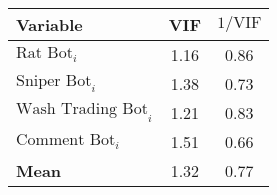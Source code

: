 \begin{tabular}{lcc}
\toprule
Variable & VIF & $1/\text{VIF}$ \\
\midrule
$\text{Rat Bot}_{i}$ & 1.16 & 0.86 \\
$\text{Sniper Bot}_{i}$ & 1.38 & 0.73 \\
$\text{Wash Trading Bot}_{i}$ & 1.21 & 0.83 \\
$\text{Comment Bot}_{i}$ & 1.51 & 0.66 \\
\midrule
\textbf{Mean} & 1.32 & 0.77 \\
\bottomrule
\end{tabular}